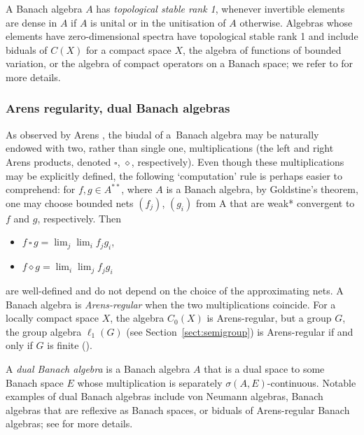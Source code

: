 \documentclass[12pt,fleqn]{amsart}
\theoremstyle{definition}
\numberwithin{equation}{section}
\theoremstyle{remark}
\begin{document}
A Banach algebra $A$ has \emph{topological stable rank 1}, whenever invertible elements are dense in $A$ if $A$ is unital or in the unitisation of $A$ otherwise. 
Algebras whose elements have zero-dimensional spectra have topological stable rank 1 and include biduals of $C(X)$ for a compact space $X$, the algebra of functions of bounded variation, or the algebra of compact operators on a Banach space; we refer to \cite[Section 2]{DraKa} for more details.

\subsubsection{Arens regularity, dual Banach algebras}
As observed by Arens \cite{arens1951adjoint}, the biudal of a~Banach algebra may be naturally endowed with two, rather than single one, multiplications (the left and right Arens products, denoted ${\scriptstyle\square}$, $\diamond$, respectively). Even though these multiplications may be explicitly defined, the following `computation' rule is perhaps easier to comprehend: for $f,g\in A^{**}$, where $A$ is a Banach algebra, by {Goldstine's} theorem, one may choose bounded nets $(f_j)$, $(g_i)$ from A that are weak* convergent to $f$ and $g$, respectively. Then
\begin{itemize}
    \item $f\, {\scriptstyle\square}\, g = \lim_j \lim_i f_j g_i$,
    \item $f \diamond g = \lim_i \lim_j f_j g_i$
\end{itemize}
are well-defined and do not depend on the choice of the approximating nets. A Banach algebra is \emph{Arens-regular} when the two multiplications coincide. For a locally compact space $X$, the algebra $C_0(X)$ is Arens-regular, but a group $G$, the group algebra $\ell_1(G)$ (see Section~\ref{sect:semigroup}) is Arens-regular if and only if $G$ is finite (\cite{young1973irregularity}).

A \emph{dual Banach algebra} is a Banach algebra $A$ that is a dual space to some Banach space $E$ whose multiplication is separately $\sigma(A,E)$-continuous. Notable examples of dual Banach algebras include von Neumann algebras, Banach algebras that are reflexive as Banach spaces, or biduals of Arens-regular Banach algebras; see \cite[Section 5]{daws2008ultrapowers} for more details. 
\end{document}
